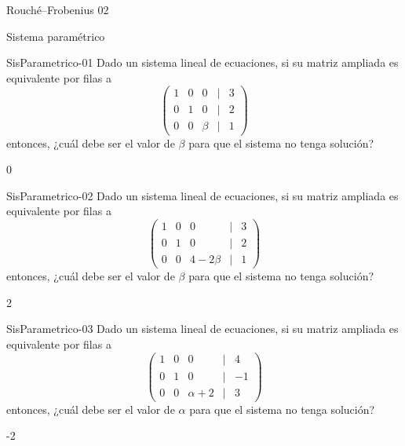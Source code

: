 \documentclass[a4,11pt]{aleph-notas}
\begin{document}
\begin{quiz}{Rouché–Frobenius 02}
\end{quiz}

\begin{quiz}{Sistema paramétrico}

\begin{numerical}[tolerance=0.01]%
    {SisParametrico-01}
    Dado un sistema lineal de ecuaciones, si su matriz ampliada es equivalente por filas a 
    \[
    \begin{pmatrix}
    1 & 0 & 0 & | & 3 \\
    0 & 1 & 0 & | & 2 \\
    0 & 0 & \beta & | & 1
    \end{pmatrix}
    \]
    entonces, ¿cuál debe ser el valor de $\beta$ para que el sistema no tenga solución?
    \item 0
\end{numerical}

\begin{numerical}[tolerance=0.01]%
    {SisParametrico-02}
    Dado un sistema lineal de ecuaciones, si su matriz ampliada es equivalente por filas a 
    \[
    \begin{pmatrix}
    1 & 0 & 0 & | & 3 \\
    0 & 1 & 0 & | & 2 \\
    0 & 0 & 4-2\beta & | & 1
    \end{pmatrix}
    \]
    entonces, ¿cuál debe ser el valor de $\beta$ para que el sistema no tenga solución?
    \item 2
\end{numerical}

\begin{numerical}[tolerance=0.01]%
    {SisParametrico-03}
    Dado un sistema lineal de ecuaciones, si su matriz ampliada es equivalente por filas a 
    \[
    \begin{pmatrix}
    1 & 0 & 0 & | & 4 \\
    0 & 1 & 0 & | & -1 \\
    0 & 0 & \alpha + 2 & | & 3
    \end{pmatrix}
    \]
    entonces, ¿cuál debe ser el valor de $\alpha$ para que el sistema no tenga solución?
    \item -2
\end{numerical}


\end{quiz}
\end{document}
